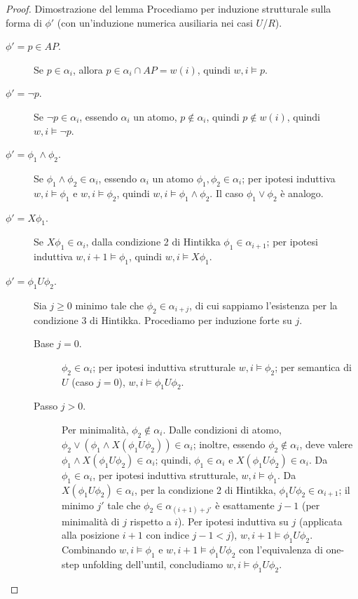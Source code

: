    \begin{proof}{Dimostrazione del lemma}
    Procediamo per induzione strutturale sulla forma di \(\phi'\) (con un'induzione numerica ausiliaria nei casi \(U\)/\(R\)).
    \begin{description}
    \item[ \(\phi' = p\in AP\).] Se \(p\in\alpha_i\), allora \(p \in \alpha_i\cap AP = w(i)\), quindi \(w,i\models p\).
    \item[ \(\phi' = \neg p\).] Se \(\neg p \in\alpha_i\), essendo \(\alpha_i\) un atomo,  \(p \notin \alpha_i\), quindi \(p\notin w(i)\), quindi \(w,i\models\neg p\).
    \item[ \(\phi' = \phi_1\land\phi_2\).] Se \(\phi_1\land\phi_2\in\alpha_i\), essendo \(\alpha_i\) un atomo \(\phi_1,\phi_2\in\alpha_i\); per ipotesi induttiva \(w,i\models\phi_1\) e \(w,i\models\phi_2\), quindi \(w,i\models\phi_1\land\phi_2\). Il caso \(\phi_1\lor\phi_2\) è analogo.
    \item[ \(\phi' = X\phi_1\).] Se \(X\phi_1\in\alpha_i\), dalla condizione 2 di Hintikka \(\phi_1\in\alpha_{i+1}\); per ipotesi induttiva \(w,i{+}1\models\phi_1\), quindi \(w,i\models X\phi_1\).
    \item[ \(\phi' = \phi_1 U \phi_2\).] Sia \(j\ge0\) minimo tale che \(\phi_2\in\alpha_{i+j}\), di cui sappiamo l'esistenza per la condizione 3 di Hintikka. Procediamo per induzione forte su \(j\).
    \begin{description}
      \item[Base \(j=0\).] \(\phi_2\in\alpha_i\); per ipotesi induttiva strutturale \(w,i\models\phi_2\); per semantica di \(U\) (caso \(j=0\)), \(w,i\models\phi_1 U\phi_2\).
      \item[Passo \(j>0\).] Per minimalità, \(\phi_2\notin\alpha_i\). Dalle condizioni di atomo, \(\phi_2\lor(\phi_1\land X(\phi_1 U\phi_2)) \in \alpha_i\); inoltre, essendo \(\phi_2\notin\alpha_i\), deve valere \(\phi_1\land X(\phi_1 U\phi_2)\in\alpha_i\); quindi, \(\phi_1\in\alpha_i\) e \(X(\phi_1U\phi_2)\in\alpha_i\). Da \(\phi_1\in\alpha_i\), per ipotesi induttiva strutturale, \(w,i\models\phi_1\). Da \(X(\phi_1U\phi_2)\in\alpha_i\), per la condizione 2 di Hintikka, \(\phi_1U\phi_2\in\alpha_{i+1}\); il minimo \(j'\) tale che \(\phi_2\in\alpha_{(i+1)+j'}\) è esattamente \(j-1\) (per minimalità di \(j\) rispetto a \(i\)). Per ipotesi induttiva su \(j\) (applicata alla posizione \(i{+}1\) con indice \(j-1<j\)), \(w,i{+}1\models\phi_1 U\phi_2\). Combinando \(w,i\models\phi_1\) e \(w,i{+}1\models\phi_1U\phi_2\) con l'equivalenza di one-step unfolding dell'until, concludiamo \(w,i\models\phi_1U\phi_2\).

\end{description}
\end{description}
\end{proof}
